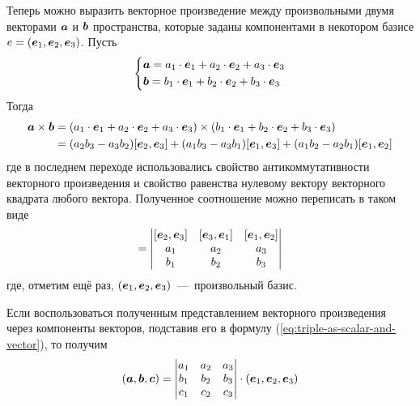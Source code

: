 \documentclass[a4paper,12pt]{article}
\begin{document}
  Теперь можно выразить векторное произведение между произвольными двумя векторами $\boldsymbol a$ и $\boldsymbol b$ пространства, которые заданы компонентами в некотором базисе $e \hm= (\bds e_1, \bds e_2, \bds e_3)$.
  Пусть
  \[
    \left\{
      \begin{aligned}
        &\boldsymbol a = a_1 \cdot \boldsymbol e_1 + a_2 \cdot \boldsymbol e_2 + a_3 \cdot \boldsymbol e_3\\
        &\boldsymbol b = b_1 \cdot \boldsymbol e_1 + b_2 \cdot \boldsymbol e_2 + b_3 \cdot \boldsymbol e_3
      \end{aligned}
    \right.
  \]
  Тогда
  \begin{equation*}
  \begin{split}
    \boldsymbol a \times \boldsymbol b
    =\; &(a_1 \cdot \boldsymbol e_1 + a_2 \cdot \boldsymbol e_2 + a_3 \cdot \boldsymbol e_3) \times (b_1 \cdot \boldsymbol e_1 + b_2 \cdot \boldsymbol e_2 + b_3 \cdot \boldsymbol e_3)\\
    =\; &(a_2 b_3 - a_3 b_2)[\boldsymbol e_2, \boldsymbol e_3] + (a_1 b_3 - a_3 b_1)[\boldsymbol e_1, \boldsymbol e_3] + (a_1 b_2 - a_2 b_1)[\boldsymbol e_1, \boldsymbol e_2]
  \end{split}
  \end{equation*}
  где в последнем переходе использовались свойство антикоммутативности векторного произведения и свойство равенства нулевому вектору векторного квадрата любого вектора.
  Полученное соотношение можно переписать в таком виде
  \begin{equation}
    [\bds a, \bds b] = \begin{vmatrix}
      [\bds e_2, \bds e_3] & [\bds e_3, \bds e_1] & [\bds e_1, \bds e_2]\\
      a_1 & a_2 & a_3\\
      b_1 & b_2 & b_3
    \end{vmatrix}
  \end{equation}
  где, отметим ещё раз, $(\boldsymbol e_1, \boldsymbol e_2, \boldsymbol e_3)$~---~произвольный базис.
  
  Если воспользоваться полученным представлением векторного произведения через компоненты векторов, подставив его в формулу (\ref{eq:triple-as-scalar-and-vector}), то получим
  \begin{equation}
    (\boldsymbol a, \boldsymbol b, \boldsymbol c) = \begin{vmatrix}
      a_1 & a_2 & a_3\\
      b_1 & b_2 & b_3\\
      c_1 & c_2 & c_3
    \end{vmatrix} \cdot (\boldsymbol e_1, \boldsymbol e_2, \boldsymbol e_3)
  \end{equation}
\end{document}
